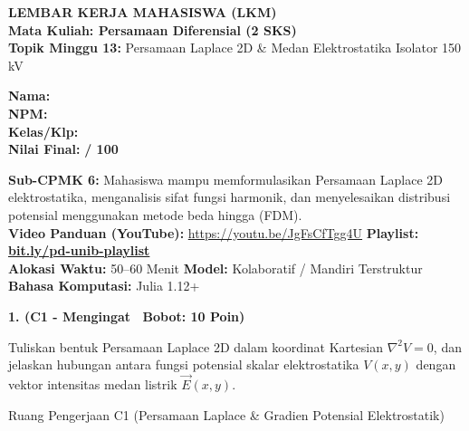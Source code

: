 \documentclass[10pt,a4paper]{article}
\begin{document}
\noindent\begin{minipage}[c]{0.68\textwidth}%
  {\large\textbf{\color{unibblue}LEMBAR KERJA MAHASISWA (LKM)}}\\[1mm]
  {\normalsize\textbf{Mata Kuliah: Persamaan Diferensial (2 SKS)}}\\[0.5mm]
  {\small\textbf{Topik Minggu 13:} Persamaan Laplace 2D \& Medan Elektrostatika Isolator 150 kV}%
\end{minipage}%
\hfill%
\begin{minipage}[c]{0.30\textwidth}%
  \begin{tcolorbox}[colback=unibblue!5,colframe=unibblue,boxrule=0.6pt,arc=2pt,left=4pt,right=4pt,top=2pt,bottom=2pt]
    \scriptsize
    \textbf{Nama:} \dotfill\\[1.2mm]
    \textbf{NPM:} \dotfill\\[1.2mm]
    \textbf{Kelas/Klp:} \dotfill\\[1.2mm]
    \textbf{Nilai Final:} \hfill \textbf{/ 100}
  \end{tcolorbox}%
\end{minipage}\par

\vspace{1.5mm}

\begin{tcolorbox}[colback=boxbg,colframe=unibgold!90!black,boxrule=0.6pt,arc=2pt,left=5pt,right=5pt,top=3pt,bottom=3pt,title=\textbf{\scriptsize Capaian Pembelajaran (Sub-CPMK 6) \& Pedoman Evaluasi OBE}]
  \scriptsize
  \textbf{Sub-CPMK 6:} Mahasiswa mampu memformulasikan Persamaan Laplace 2D elektrostatika, menganalisis sifat fungsi harmonik, dan menyelesaikan distribusi potensial menggunakan metode beda hingga (FDM).\\
  \textbf{Video Panduan (YouTube):} \url{https://youtu.be/JgFsCfTgg4U} \hfill \textbf{Playlist:} \href{https://www.youtube.com/playlist?list=PLS5oOZWXZeTw}{\color{unibblue}\textbf{bit.ly/pd-unib-playlist}}\\\textbf{Alokasi Waktu:} 50--60 Menit \quad\textbar\quad \textbf{Model:} Kolaboratif / Mandiri Terstruktur \quad\textbar\quad \textbf{Bahasa Komputasi:} Julia 1.12+
\end{tcolorbox}

\vspace{1mm}

\noindent\textbf{1. (C1 - Mengingat \textbar\ Bobot: 10 Poin)}\par\vspace{0.5mm}
{\footnotesize Tuliskan bentuk Persamaan Laplace 2D dalam koordinat Kartesian $\nabla^2 V = 0$, dan jelaskan hubungan antara fungsi potensial skalar elektrostatika $V(x,y)$ dengan vektor intensitas medan listrik $\vec{E}(x,y)$.}
\begin{answerbox}{Ruang Pengerjaan C1 (Persamaan Laplace \& Gradien Potensial Elektrostatik)}
  \vspace{2.0cm}
\end{answerbox}
\end{document}
